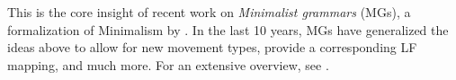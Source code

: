 This is the core insight of recent work on \emph{Minimalist grammars} (MGs), a formalization of Minimalism by \citet{Stabler97}.
In the last 10 years, MGs have generalized the ideas above to allow for new movement types, provide a corresponding LF mapping, and much more.
For an extensive overview, see \citet{Graf13Thesis}.
